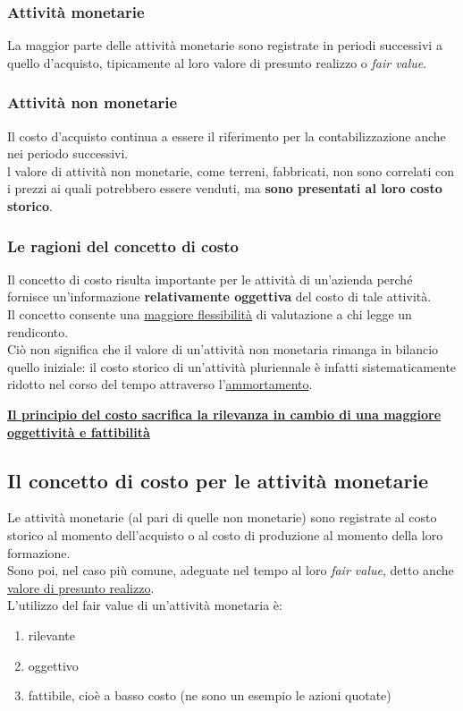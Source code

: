 \documentclass{article}
\begin{document}
\subsubsection*{Attività monetarie}
La maggior parte delle attività monetarie sono registrate in periodi successivi a quello
d'acquisto, tipicamente al loro valore di presunto realizzo o \textit{fair value}.

\subsubsection*{Attività non monetarie}
Il costo d'acquisto continua a essere il riferimento per la contabilizzazione anche nei periodo
successivi.\\
l valore di attività non monetarie, come terreni, fabbricati, non sono correlati con i prezzi ai
quali potrebbero essere venduti, ma \textbf{sono presentati al loro costo storico}.


\subsubsection{Le ragioni del concetto di costo}
Il concetto di costo risulta importante per le attività di un'azienda perché fornisce un'informazione \textbf{relativamente oggettiva} del costo di tale attività.\\
Il concetto consente una \underline{maggiore flessibilità} di valutazione a chi legge un rendiconto.\\
Ciò non significa che il valore di un'attività non monetaria rimanga in
bilancio quello iniziale: il costo storico di un'attività pluriennale è infatti
sistematicamente ridotto nel corso del tempo attraverso l'\underline{ammortamento}.
\begin{center}
    \underline{\textbf{Il principio del costo sacrifica la rilevanza in cambio di una maggiore oggettività e fattibilità}}
\end{center}




\subsection{Il concetto di costo per le attività monetarie}
Le attività monetarie (al pari di quelle non monetarie) sono registrate al costo storico al momento
dell'acquisto o al costo di produzione al momento della loro formazione.\\
Sono poi, nel caso più comune, adeguate nel tempo al loro \textit{fair value}, detto anche \underline{valore di
presunto realizzo}.\\
L'utilizzo del fair value di un'attività monetaria è:
\begin{enumerate}
    \item rilevante
    \item oggettivo
    \item fattibile, cioè a basso costo (ne sono un esempio le azioni quotate)
\end{enumerate}
\end{document}
